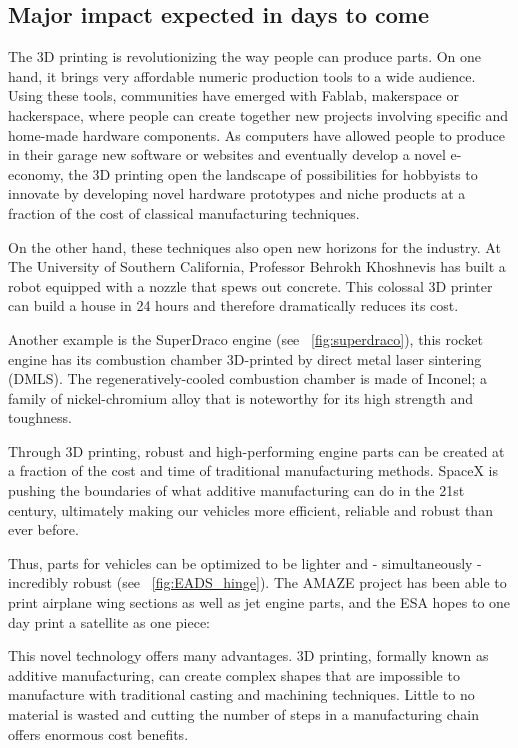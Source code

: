 \subsection{Major impact expected in days to come} %

The 3D printing is revolutionizing the way people can produce parts. On one hand, it brings very affordable numeric production tools to a wide audience. Using these tools, communities have emerged with Fablab, makerspace or hackerspace, where people can create together new projects involving specific and home-made hardware components. As computers have allowed people to produce in their garage new software or websites and eventually develop a novel e-economy, the 3D printing open the landscape of possibilities for hobbyists to innovate by developing novel hardware prototypes and niche products at a fraction of the cost of classical manufacturing techniques.

On the other hand, these techniques also open new horizons for the industry. At The University of Southern California, Professor Behrokh Khoshnevis has built a robot equipped with a nozzle that spews out concrete. This  colossal 3D printer can build a house in 24 hours and therefore dramatically reduces its cost.

Another example is the SuperDraco engine (see \figurename~\ref{fig:superdraco}), this rocket engine has its combustion chamber 3D-printed by direct metal laser sintering (DMLS). The regeneratively-cooled combustion chamber is made of Inconel; a family of nickel-chromium alloy that is noteworthy for its high strength and toughness.

\begin{formal}
    Through 3D printing, robust and high-performing engine parts can be created at a fraction of the cost and time of traditional manufacturing methods. SpaceX is pushing the boundaries of what additive manufacturing can do in the 21st century, ultimately making our vehicles more efficient, reliable and robust than ever before.

\end{formal}

Thus, parts for vehicles can be optimized to be lighter and - simultaneously - incredibly robust (see \figurename~\ref{fig:EADS_hinge}). The AMAZE project has been able to print airplane wing sections as well as jet engine parts, and the ESA hopes to one day print a satellite as one piece:
\begin{formal}
    This novel technology offers many advantages. 3D printing, formally known as additive manufacturing, can create complex shapes that are impossible to manufacture with traditional casting and machining techniques. Little to no material is wasted and cutting the number of steps in a manufacturing chain offers enormous cost benefits.

\end{formal}

